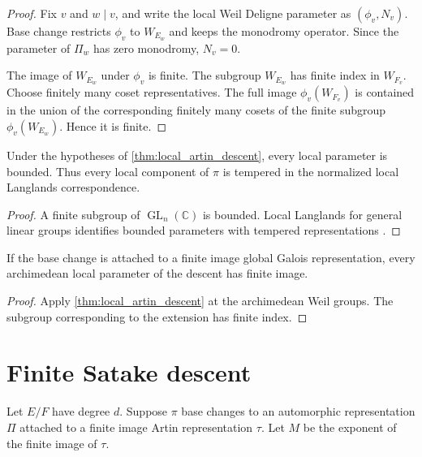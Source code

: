 \documentclass{aomart}
\theoremstyle{definition}
\theoremstyle{remark}
\newcommand{\CC}{\mathbb C}
\newcommand{\GL}{\operatorname{GL}}
\begin{document}
\begin{proof}
Fix \(v\) and \(w\mid v\), and write the local Weil Deligne parameter as \((\phi_v,N_v)\). Base change restricts \(\phi_v\) to \(W_{E_w}\) and keeps the monodromy operator. Since the parameter of \(\Pi_w\) has zero monodromy, \(N_v=0\).

The image of \(W_{E_w}\) under \(\phi_v\) is finite. The subgroup \(W_{E_w}\) has finite index in \(W_{F_v}\). Choose finitely many coset representatives. The full image \(\phi_v(W_{F_v})\) is contained in the union of the corresponding finitely many cosets of the finite subgroup \(\phi_v(W_{E_w})\). Hence it is finite.
\end{proof}

\begin{corollary}\label{cor:tempered_local_descent}
Under the hypotheses of \cref{thm:local_artin_descent}, every local parameter is bounded. Thus every local component of \(\pi\) is tempered in the normalized local Langlands correspondence.
\end{corollary}

\begin{proof}
A finite subgroup of \(\GL_n(\CC)\) is bounded. Local Langlands for general linear groups identifies bounded parameters with tempered representations \cite{Henniart2000}.
\end{proof}

\begin{corollary}\label{cor:artin_infinity}
If the base change is attached to a finite image global Galois representation, every archimedean local parameter of the descent has finite image.
\end{corollary}

\begin{proof}
Apply \cref{thm:local_artin_descent} at the archimedean Weil groups. The subgroup corresponding to the extension has finite index.
\end{proof}

\section{Finite Satake descent}\label{sec:finite_satake}

Let \(E/F\) have degree \(d\). Suppose \(\pi\) base changes to an automorphic representation \(\Pi\) attached to a finite image Artin representation \(\tau\). Let \(M\) be the exponent of the finite image of \(\tau\).
\end{document}

